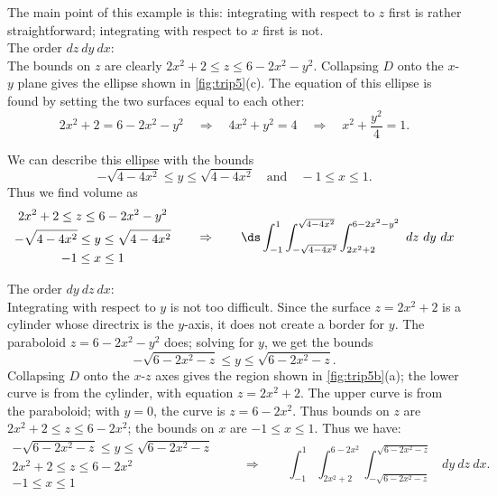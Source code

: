 {The main point of this example is this: integrating with respect to $z$ first is rather straightforward; integrating with respect to $x$ first is not.\\

\noindent The order $dz\ dy\ dx$:\\

The bounds on $z$ are clearly $2x^2+2\leq z\leq 6-2x^2-y^2$. Collapsing $D$ onto the $x$-$y$ plane gives the ellipse shown in \autoref{fig:trip5}(c). The equation of this ellipse is found by setting the two surfaces equal to each other: 
\[2x^2+2 = 6-2x^2-y^2\quad \Rightarrow\quad 4x^2+y^2=4\quad \Rightarrow\quad x^2+\frac{y^2}4=1.\]

We can describe this ellipse with the bounds 
\[-\sqrt{4-4x^2} \leq y\leq \sqrt{4-4x^2}\quad \text{and}\quad -1\leq x\leq 1.\]
Thus we find volume as
\[
	\begin{gathered}
		2x^2+2\leq z\leq 6-2x^2-y^2\\
		-\sqrt{4-4x^2}\leq y\leq \sqrt{4-4x^2}\\
		-1\leq x\leq 1
	\end{gathered} 
	\qquad\Rightarrow\qquad
	\ds\int_{-1}^1\int_{-\sqrt{4-4x^2}}^{\sqrt{4-4x^2}}\int_{2x^2+2}^{6-2x^2-y^2}\ dz\ dy\ dx 
\]

\noindent The order $dy\ dz\ dx$:\\

Integrating with respect to $y$ is not too difficult. Since the surface $z=2x^2+2$ is a cylinder whose directrix is the $y$-axis, it does not create a border for $y$. The paraboloid $z=6-2x^2-y^2$ does; solving for $y$, we get the bounds 
\[-\sqrt{6-2x^2-z}\leq y\leq \sqrt{6-2x^2-z}.\]
Collapsing $D$ onto the $x$-$z$ axes gives the region shown in \autoref{fig:trip5b}(a); the lower curve is from the cylinder, with equation $z=2x^2+2$. The upper curve is from the paraboloid; with $y=0$, the curve is $z=6-2x^2$. Thus bounds on $z$ are $2x^2+2\leq z\leq 6-2x^2$; the bounds on $x$ are $-1\leq x\leq 1$. Thus we have:
\[
	\begin{gathered}
		-\sqrt{6-2x^2-z}\leq y\leq \sqrt{6-2x^2-z}\\
		2x^2+2\leq z\leq 6-2x^2\\
		-1\leq x\leq 1
	\end{gathered}
	\qquad\Rightarrow\qquad
	\int_{-1}^1\int_{2x^2+2}^{6-2x^2}\int_{-\sqrt{6-2x^2-z}}^{\sqrt{6-2x^2-z}}\ dy\ dz\ dx.
\]

}
